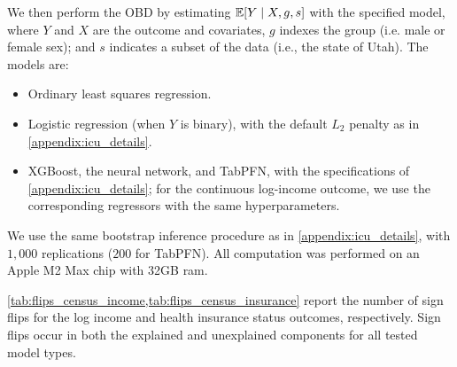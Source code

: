 We then perform the OBD by estimating $\mathbb{E}[Y \mid X, g, s]$ with the specified model, 
where \( Y \) and \( X \) are the outcome and covariates, 
\( g \) indexes the group (i.e. male or female sex);
and \( s \) indicates a subset of the data (i.e., the state of Utah).
The models are:
\begin{itemize}
    \item Ordinary least squares regression.
    \item Logistic regression (when $Y$ is binary), with the default $L_2$ penalty as in \cref{appendix:icu_details}. %
    \item XGBoost, the neural network, and TabPFN, with the specifications of \cref{appendix:icu_details}; for the continuous log-income outcome, we use the corresponding regressors with the same hyperparameters.
\end{itemize}
We use the same bootstrap inference procedure as in \cref{appendix:icu_details}, with $1{,}000$ replications ($200$ for TabPFN). %
All computation was performed on an Apple M2 Max chip with 32GB ram.

\cref{tab:flips_census_income,tab:flips_census_insurance} report the number of sign flips for the log income and health insurance status outcomes, respectively.
Sign flips occur in both the explained and unexplained components for all tested model types.

